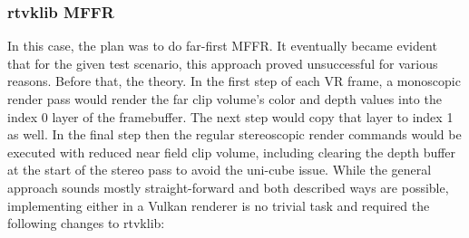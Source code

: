 \subsubsection{rtvklib MFFR}
In this case, the plan was to do far-first MFFR. It eventually became evident that for the given test scenario, this approach proved unsuccessful for various reasons. 
Before that, the theory. In the first step of each VR frame, a monoscopic render pass would render the far clip volume's color and depth values into the index 0 layer of the framebuffer. The next step would copy that layer to index 1 as well. In the final step then the regular stereoscopic render commands would be executed with reduced near field clip volume, including clearing the depth buffer at the start of the stereo pass to avoid the uni-cube issue. 
While the general approach sounds mostly straight-forward and both described ways are possible, implementing either in a Vulkan renderer is no trivial task and required the following changes to rtvklib: 

